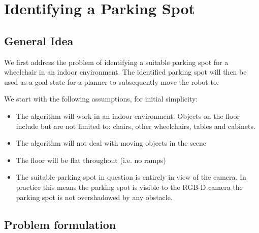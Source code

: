 \chapter{Identifying a Parking Spot}


\section{General Idea}
We first address the problem of identifying a suitable parking spot for a
wheelchair in an indoor environment. The identified parking spot will then be
used as a goal state for a planner to subsequently move the robot to.

We start with the following assumptions, for initial simplicity:
\begin{itemize}
\item The algorithm will work in an indoor environment. Objects on the floor
include but are not limited to: chairs, other wheelchairs, tables and cabinets.
\item The algorithm will not deal with moving objects in the scene
\item The floor will be flat throughout (i.e. no ramps)
\item The suitable parking spot in question is entirely in view of the camera.
In practice this means the parking spot is visible to the RGB-D camera 
the parking spot is not overshadowed by any obstacle.
\end{itemize}



\section{Problem formulation}


